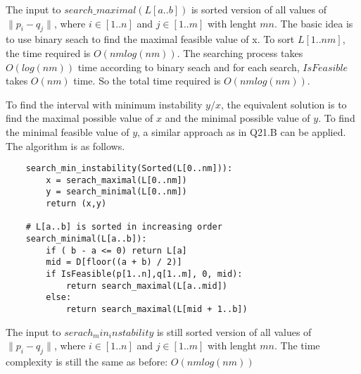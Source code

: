 \documentclass[12pt,a4paper]{article}
\newcommand{\question}[1]{\bigskip\noindent{\textbf{Q{#1} solution}}}
\begin{document}
The input to $search\_maximal(L[a..b])$ is sorted version of all values of $\|p_i - q_j\|$, where $i \in [1..n]$ and $j \in [1..m]$ with lenght $mn$. The basic idea is to use binary seach to find the maximal feasible value of x. To sort $L[1..nm]$, the time required is $O(nmlog(nm))$. The searching process takes $O(log(nm))$ time according to binary seach and for each search, $IsFeasible$ takes $O(nm)$ time. So the total time required is $O(nmlog(nm))$.

\question{21.C}

To find the interval with minimum instability $y / x$, the equivalent solution is to find the maximal possible value of $x$ and the minimal possible value of $y$. To find the minimal feasible value of $y$, a similar approach as in Q21.B can be applied. The algorithm is as follows.

\begin{lstlisting}
	search_min_instability(Sorted(L[0..nm])):
		x = serach_maximal(L[0..nm])
		y = search_minimal(L[0..nm])
		return (x,y)
	
	# L[a..b] is sorted in increasing order
	search_minimal(L[a..b]):
		if ( b - a <= 0) return L[a]
		mid = D[floor((a + b) / 2)]
		if IsFeasible(p[1..n],q[1..m], 0, mid):
			return search_maximal(L[a..mid])
		else:
			return search_maximal(L[mid + 1..b])
\end{lstlisting}

The input to $serach_min_instability$ is still sorted version of all values of $\|p_i - q_j\|$, where $i \in [1..n]$ and $j \in [1..m]$ with lenght $mn$. The time complexity is still the same as before: $O(nmlog(nm))$
\end{document}

